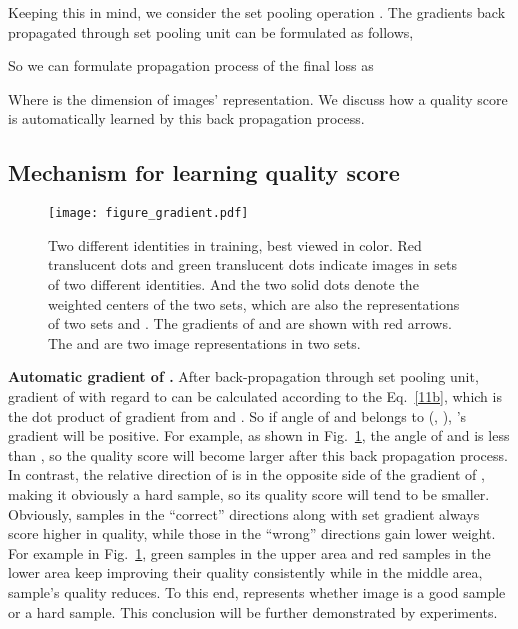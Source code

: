 \documentclass[10pt,twocolumn,letterpaper]{article}
\begin{document}
Keeping this in mind, we consider the set pooling operation . The gradients back propagated through set pooling unit can be formulated as follows,


So we can formulate propagation process of the final loss as


Where  is the dimension of images' representation. We discuss how a quality score  is automatically learned by this back propagation process.


\subsection{Mechanism for learning quality score}

\begin{figure}[!htbp]
  \centering
  \texttt{[image: figure\_gradient.pdf]}
  \caption{Two different identities in training, best viewed in color. Red translucent dots and green translucent dots indicate images in sets of two different identities. And the two solid dots denote the weighted centers of the two sets, which are also the representations of two sets  and  . The gradients of  and   are shown with red arrows. The  and  are two image representations in two sets.} 
  \label{fig:gradient}
\end{figure}

\textbf{Automatic gradient of .}
After back-propagation through set pooling unit, gradient of  with regard to  can be calculated according to the Eq.~\ref{11b}, which is the dot product of gradient from  and . So if angle of  and  belongs to (, ), 's gradient will be positive. For example, as shown in Fig.~\ref{fig:gradient}, the angle of  and  is less than , so the  quality score  will become larger after this back propagation process. In contrast, the relative direction of  is in the opposite side of the gradient of , making it obviously a hard sample, so its quality score  will tend to be smaller. Obviously, samples in the ``correct'' directions along with set gradient  always score higher in quality, while those in the ``wrong'' directions gain lower weight. For example in Fig.~\ref{fig:gradient}, green samples in the upper area and red samples in the lower area keep improving their quality consistently while in the middle area, sample's quality reduces. To this end,  represents whether  image is a good sample or a hard sample. This conclusion will be further demonstrated by experiments.
\end{document}
